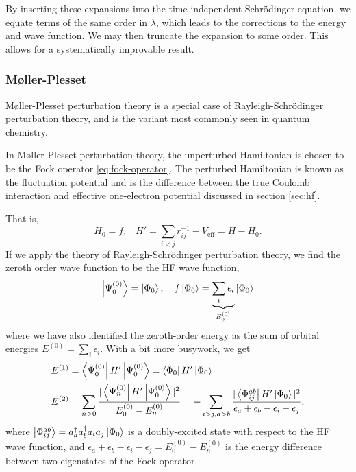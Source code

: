 By inserting these expansions into the time-independent Schr\"odinger equation, we equate terms of the same order in $\lambda$, which leads to the corrections to the energy and wave function. We may then truncate the expansion to some order. This allows for a systematically improvable result.

\subsubsection{M{\o}ller-Plesset}

M{\o}ller-Plesset perturbation theory\cite{mollerNote1934} is a special case of Rayleigh-Schr\"odinger perturbation theory, and is the variant most commonly seen in quantum chemistry.

In M{\o}ller-Plesset perturbation theory, the unperturbed Hamiltonian is chosen to be the Fock operator \ref{eq:fock-operator}. The perturbed Hamiltonian is known as the fluctuation potential and is the difference between the true Coulomb interaction and effective one-electron potential discussed in section \ref{sec:hf}.

That is,
\begin{equation}
    H_0 = f, \hspace{10pt} H' = \sum_{i<j} r_{ij}^{-1}-V_\mathrm{eff} = H-H_0.
\end{equation}
If we apply the theory of Rayleigh-Schr\"odinger perturbation theory, we find the zeroth order wave function to be the \gls{HF} wave function,
\begin{equation}
    \ket{\Psi_0^{(0)}} = \ket{\Phi_0}, \hspace{10pt}
    f\ket{\Phi_0} = \underbrace{\sum_i\epsilon_i}_{E_0^{(0)}}\ket{\Phi_0}
\end{equation}
where we have also identified the zeroth-order energy as the sum of orbital energies $E^{(0)}=\sum_i\epsilon_i$. With a bit more busywork, we get
\begin{align}
    E^{(1)} &= \bra{\Psi_0^{(0)}}H'\ket{\Psi_0^{(0)}} = \bra{\Phi_0}H'\ket{\Phi_0} \\
    E^{(2)} &=
    \sum_{n>0} \frac{|\bra{\Psi_n^{(0)}}H'\ket{\Psi_0^{(0)}}|^2}{E_0^{(0)}-E_n^{(0)}} =
    -\sum_{i>j,a>b}\frac{|\bra{\Phi_{ij}^{ab}}H'\ket{\Phi_0}|^2}{\epsilon_a+\epsilon_b-\epsilon_i-\epsilon_j},
\end{align}
where $\ket{\Phi_{ij}^{ab}}=a_a^\dag a_b^\dag a_ia_j\ket{\Phi_0}$ is a doubly-excited state with respect to the HF wave function, and $\epsilon_a+\epsilon_b-\epsilon_i-\epsilon_j = E_0^{(0)} - E_n^{(0)}$ is the energy difference between two eigenstates of the Fock operator.

